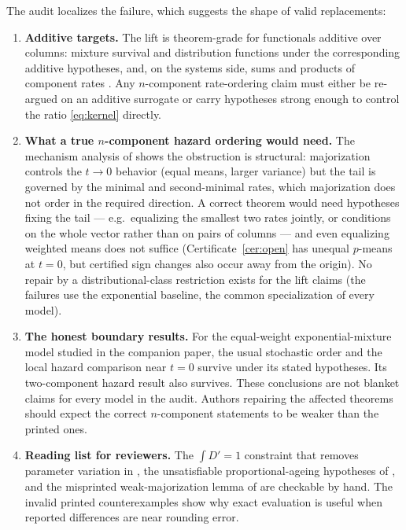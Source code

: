 \documentclass[10pt]{article}
\theoremstyle{plain}
\theoremstyle{definition}
\theoremstyle{remark}
\begin{document}
The audit localizes the failure, which suggests the shape of valid replacements:

\begin{enumerate}
\item \textbf{Additive targets.} The lift is theorem-grade for functionals additive over columns: mixture survival and distribution functions under the corresponding additive hypotheses, and, on the systems side, sums and products of component rates \cite{BalakrishnanHaidariMasoumifard2015}. Any $n$-component rate-ordering claim must either be re-argued on an additive surrogate or carry hypotheses strong enough to control the ratio \eqref{eq:kernel} directly.
\item \textbf{What a true $n$-component hazard ordering would need.} The mechanism analysis of \cite{Guo2026hazard} shows the obstruction is structural: majorization controls the $t\to0$ behavior (equal means, larger variance) but the tail is governed by the minimal and second-minimal rates, which majorization does not order in the required direction. A correct theorem would need hypotheses fixing the tail --- e.g.\ equalizing the smallest two rates jointly, or conditions on the whole vector rather than on pairs of columns --- and even equalizing weighted means does not suffice (Certificate~\ref{cer:open} has unequal $p$-means at $t=0$, but certified sign changes also occur away from the origin). No repair by a distributional-class restriction exists for the lift claims (the failures use the exponential baseline, the common specialization of every model).
\item \textbf{The honest boundary results.} For the equal-weight exponential-mixture model studied in the companion paper, the usual stochastic order and the local hazard comparison near $t=0$ survive under its stated hypotheses. Its two-component hazard result also survives. These conclusions are not blanket claims for every model in the audit. Authors repairing the affected theorems should expect the correct $n$-component statements to be weaker than the printed ones.
\item \textbf{Reading list for reviewers.} The $\int D'=1$ constraint that removes parameter variation in \cite{ShekariEtAl2026}, the unsatisfiable proportional-ageing hypotheses of \cite{BhaktaTorradoDasKayal2024}, and the misprinted weak-majorization lemma of \cite{BhaktaKayalFinkelstein2024} are checkable by hand. The invalid printed counterexamples show why exact evaluation is useful when reported differences are near rounding error.
\end{enumerate}
\end{document}
